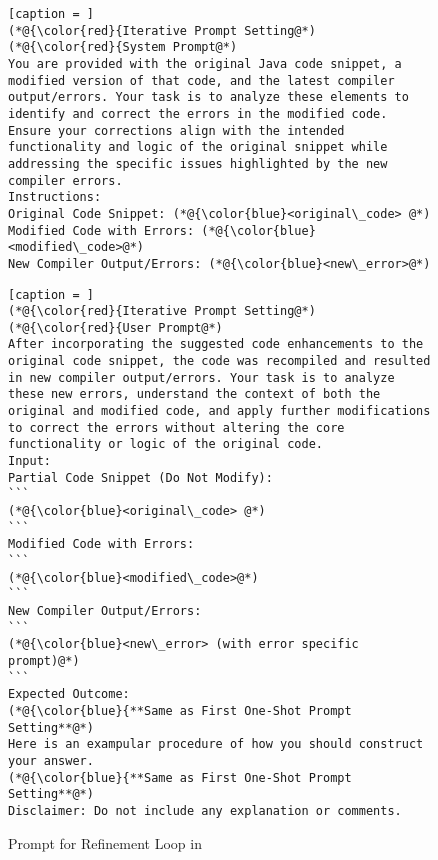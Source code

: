 \begin{figure}[t]
	\centering
\begin{minipage}{.5\textwidth}        
\begin{lstlisting}[caption = ]
(*@{\color{red}{Iterative Prompt Setting@*)
(*@{\color{red}{System Prompt@*)
You are provided with the original Java code snippet, a modified version of that code, and the latest compiler output/errors. Your task is to analyze these elements to identify and correct the errors in the modified code. Ensure your corrections align with the intended functionality and logic of the original snippet while addressing the specific issues highlighted by the new compiler errors.
Instructions:
Original Code Snippet: (*@{\color{blue}<original\_code> @*)
Modified Code with Errors: (*@{\color{blue}<modified\_code>@*)
New Compiler Output/Errors: (*@{\color{blue}<new\_error>@*)
\end{lstlisting}
\end{minipage}
\begin{minipage}{.5\textwidth}        
\begin{lstlisting}[caption = ]
(*@{\color{red}{Iterative Prompt Setting@*)
(*@{\color{red}{User Prompt@*)
After incorporating the suggested code enhancements to the original code snippet, the code was recompiled and resulted in new compiler output/errors. Your task is to analyze these new errors, understand the context of both the original and modified code, and apply further modifications to correct the errors without altering the core functionality or logic of the original code.
Input:
Partial Code Snippet (Do Not Modify): 
```
(*@{\color{blue}<original\_code> @*)
```
Modified Code with Errors: 
```
(*@{\color{blue}<modified\_code>@*)
```
New Compiler Output/Errors: 
```
(*@{\color{blue}<new\_error> (with error specific prompt)@*)
```
Expected Outcome:
(*@{\color{blue}{**Same as First One-Shot Prompt Setting**@*)
Here is an exampular procedure of how you should construct your answer.
(*@{\color{blue}{**Same as First One-Shot Prompt Setting**@*)
Disclaimer: Do not include any explanation or comments.
\end{lstlisting}
\end{minipage}

\vspace{-12pt}
\caption{Prompt for Refinement Loop in {\tool}}
\label{fig:refine-prompt}
\end{figure}
